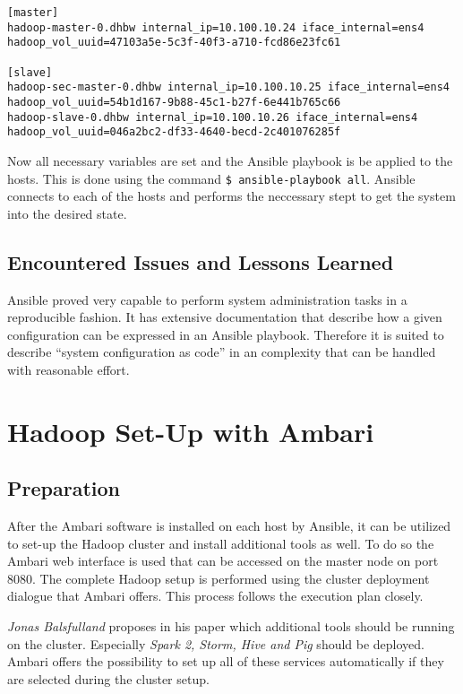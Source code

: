 \lstset{language=sh}
\begin{lstlisting}[caption={Exemplary inventory description in Ansible}, label={lst:inventory}]
[master]
hadoop-master-0.dhbw internal_ip=10.100.10.24 iface_internal=ens4 hadoop_vol_uuid=47103a5e-5c3f-40f3-a710-fcd86e23fc61

[slave]
hadoop-sec-master-0.dhbw internal_ip=10.100.10.25 iface_internal=ens4 hadoop_vol_uuid=54b1d167-9b88-45c1-b27f-6e441b765c66
hadoop-slave-0.dhbw internal_ip=10.100.10.26 iface_internal=ens4 hadoop_vol_uuid=046a2bc2-df33-4640-becd-2c401076285f
\end{lstlisting}

Now all necessary variables are set and the Ansible playbook is be applied to the hosts.
This is done using the command \texttt{\$ ansible-playbook all}.
Ansible connects to each of the hosts and performs the neccessary stept to get the system into the desired state.

\subsection{Encountered Issues and Lessons Learned}

Ansible proved very capable to perform system administration tasks in a reproducible fashion. 
It has extensive documentation that describe how a given configuration can be expressed in an Ansible playbook. 
Therefore it is suited to describe \enquote{system configuration as code} in an complexity that can be handled with reasonable effort.

\section{Hadoop Set-Up with Ambari}

\subsection{Preparation}

After the Ambari software is installed on each host by Ansible, it can be utilized to set-up the Hadoop cluster and install additional tools as well.
To do so the Ambari web interface is used that can be accessed on the master node on port 8080. The complete Hadoop setup is performed using the cluster deployment dialogue that Ambari offers. This process follows the execution plan closely.

\emph{Jonas Balsfulland} proposes in his paper which additional tools should be running on the cluster. Especially \emph{Spark 2, Storm, Hive and Pig} should be deployed.
Ambari offers the possibility to set up all of these services automatically if they are selected during the cluster setup.

